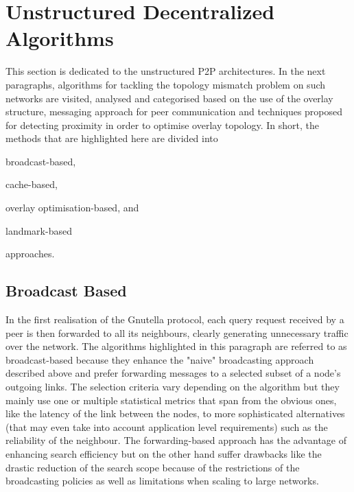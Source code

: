 \documentclass[acmcsur,acmnow]{acmtrans2m}
\begin{document}
\section{Unstructured Decentralized Algorithms}\label{sec:unstructured}

This section is dedicated to the unstructured P2P architectures. In the next paragraphs, algorithms for tackling the topology mismatch problem on such networks are visited, analysed and categorised based on the use of the overlay structure, messaging approach for peer communication and techniques proposed for detecting proximity in order to optimise overlay topology. In short, the methods that are highlighted here are divided into
\begin{inparaenum}
  \item broadcast-based,
  \item cache-based,
  \item overlay optimisation-based, and
  \item landmark-based
\end{inparaenum}
 approaches.



\subsection{Broadcast Based}

In the first realisation of the Gnutella protocol, each query request received by a peer is then forwarded to all its
neighbours, clearly generating unnecessary traffic over the network. The algorithms highlighted in this paragraph are referred to as broadcast-based because they enhance the "naive" broadcasting approach described above and prefer forwarding messages to a selected subset of a node's outgoing links. The selection criteria vary depending on the algorithm but they mainly use one or multiple statistical metrics that span from the obvious ones, like the latency of the link between the nodes, to more sophisticated alternatives (that may even take into account application level requirements) such as the reliability of the neighbour. The forwarding-based approach has the advantage of enhancing search efficiency but on the other hand suffer drawbacks like the drastic reduction of the search scope because of the restrictions of the broadcasting policies as well as limitations when scaling to large networks.
\end{document}
